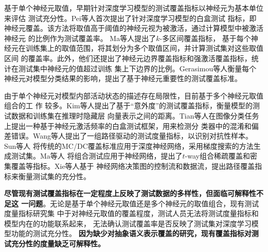 \fi






{基于单个神经元取值}，早期针对深度学习模型的测试覆盖指标以神经元为基本单位来评估
测试充分性。Pei等人首次提出了针对深度学习模型的白盒测试
指标，即神经元覆盖。该方法将取值高于阈值的神经元视为被激活，通过计算模型中被激活神经元
的比例作为测试覆盖率。 Ma等人提出了$k$-多区间覆盖指标，
基于每个神经元在训练集上的取值范围，将其划分为多个取值区间，并计算测试集对这些取值区间
的覆盖率。此外，他们还提出了神经元边界覆盖指标和强激活覆盖指标，统计在测试集中神经元的值超过训练
集上下边界的比例。Gerasimou等人衡量每个
神经元对模型分类结果的影响，提出了基于神经元重要性的测试覆盖标准。

由于单个神经元对模型内部活动状态的描述存在局限性，目前基于多个神经元取值组合的工
作
较多。Kim等人提出了基于“意外度”的测试覆盖指标，衡量模型的测试数据和训练集在推理时隐藏层
向量表示之间的距离。Tian等人在图像分类任务上提出一种基于神经元激活频率的白盒测试框架，用来检测分
类器中的混淆和偏差错误。Wang等人提出了一组路径驱动的测试度量指标，以识别对抗性样本。Sun等人
将传统的MC/DC覆盖标准应用于深度神经网络，采用梯度搜索的方法生成测试集。Ma等人
将组合测试应用于神经网络，提出了$t$-way组合稀疏覆盖和密集覆盖等指标。Xie等人基于
神经网络决策图的控制流和数据流，提出路径覆盖指标来衡量测试集的充分性。

\textbf{尽管现有测试覆盖指标在一定程度上反映了测试数据的多样性，但面临可解释性不足这
	一问题}。无论是基于单个神经元取值还是多个神经元的取值组合，现有测试度量指标研究集
中于对神经元取值的覆盖程度，测试人员无法将测试度量指标和模型内在的功能联系起来，
无法确认测试覆盖率是否反映了测试集对深度学习模型功能的测试充分性。
\textbf{因为缺少对抽象语义表示覆盖的研究，现有覆盖指标对测试充分性的度量缺乏可解释性。}

